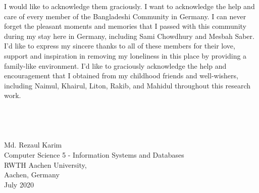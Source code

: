 \begin{acknowledgements}
\hspace*{5mm} I would like to acknowledge them graciously. I want to acknowledge the help and care of every member of the Bangladeshi Community in Germany. I can never forget the pleasant moments and memories that I passed with this community during my stay here in Germany, including Sami Chowdhury and Mesbah Saber. I'd like to express my sincere thanks to all of these members for their love, support and inspiration in removing my loneliness in this place by providing a family-like environment. I'd like to graciously acknowledge the help and encouragement that I obtained from my childhood friends and well-wishers, including Naimul, Khairul, Liton, Rakib, and Mahidul throughout this research work. \\ \\ %
\\ \\ \\ 
\flushright Md. Rezaul Karim \\
Computer Science 5 - Information Systems and Databases\\
RWTH Aachen University,\\ 
Aachen, Germany \\
July 2020

\end{acknowledgements}